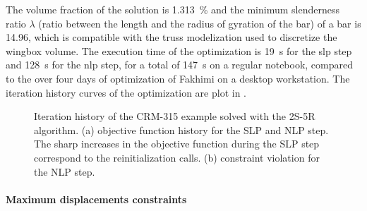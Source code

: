     The volume fraction of the solution is \qty{1.313}{\percent} and the minimum slenderness ratio $\lambda$ (ratio between the length and the radius of gyration of the bar) of a bar is 14.96, which is compatible with the truss modelization used to discretize the wingbox volume. The execution time of the optimization is \qty{19}{s} for the \gls{slp} step and \qty{128}{s} for the \gls{nlp} step, for a total of \qty{147}{s} on a regular notebook, compared to the over four days of optimization of Fakhimi \cite{fakhimi_discrete_2021} on a desktop workstation. The iteration history curves of the optimization are plot in .

    \begin{figure}
        \centering
        \bigskip
        \caption{Iteration history of the CRM-315 example solved with the 2S-5R algorithm. (a) objective function history for the SLP and NLP step. The sharp increases in the objective function during the SLP step correspond to the reinitialization calls. (b) constraint violation for the NLP step.}
        \label{fig:07_c2}
    \end{figure}

\paragraph{Maximum displacements constraints}

